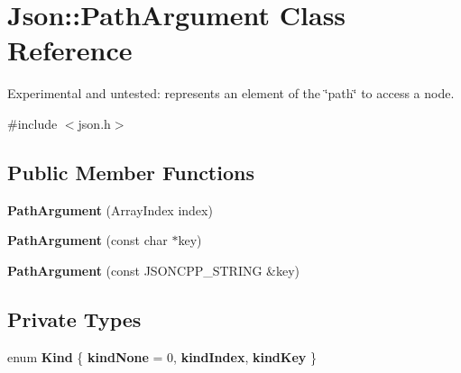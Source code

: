 \hypertarget{classJson_1_1PathArgument}{}\section{Json\+:\+:Path\+Argument Class Reference}
\label{classJson_1_1PathArgument}


Experimental and untested\+: represents an element of the \char`\"{}path\char`\"{} to access a node.  




{\ttfamily \#include $<$json.\+h$>$}

\subsection*{Public Member Functions}
\begin{DoxyCompactItemize}
\item 
\mbox{\label{classJson_1_1PathArgument_a53c5b27143b161301b95fd544c139ecf}} 
{\bfseries Path\+Argument} (Array\+Index index)
\item 
\mbox{\label{classJson_1_1PathArgument_a9690417a8a40e6e49f2acdf6c9281345}} 
{\bfseries Path\+Argument} (const char $\ast$key)
\item 
\mbox{\label{classJson_1_1PathArgument_ac15f25452124fbf21218897113015301}} 
{\bfseries Path\+Argument} (const J\+S\+O\+N\+C\+P\+P\+\_\+\+S\+T\+R\+I\+NG \&key)
\end{DoxyCompactItemize}
\subsection*{Private Types}
\begin{DoxyCompactItemize}
\item 
\mbox{\label{classJson_1_1PathArgument_a2420bbad778573c147e578701b84d9b9}} 
enum {\bfseries Kind} \{ {\bfseries kind\+None} = 0, 
{\bfseries kind\+Index}, 
{\bfseries kind\+Key}
 \}
\end{DoxyCompactItemize}
